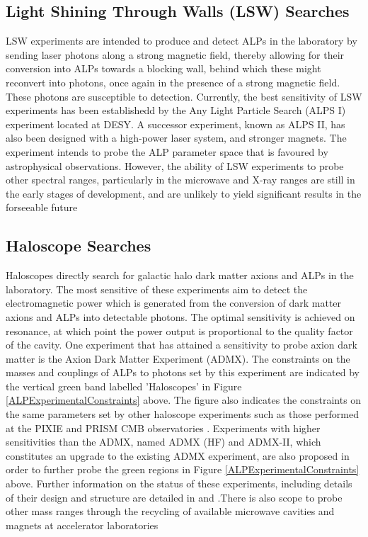 \subsection{Light Shining Through Walls (LSW) Searches}
LSW experiments are intended to produce and detect ALPs in the laboratory by sending laser photons along a strong magnetic field,
thereby allowing for their conversion into ALPs towards a blocking wall, behind which these might reconvert into photons, once again in the presence of 
a strong magnetic field. These photons are susceptible to detection. Currently, the best sensitivity of LSW experiments has been establishedd by the Any Light Particle Search
(ALPS I) experiment located at DESY. A successor experiment, known as ALPS II, has also been designed with a high-power laser system, and stronger magnets. The experiment intends to 
probe the ALP parameter space that is favoured by astrophysical observations. However, the ability of LSW experiments to probe other spectral ranges, particularly in the microwave and
X-ray ranges are still in the early stages of development, and are unlikely to yield significant results in the forseeable future
\subsection{Haloscope Searches}
Haloscopes directly search for galactic halo dark matter axions and ALPs in the laboratory. The most sensitive of these experiments aim to detect the electromagnetic power which is generated from the conversion of dark matter axions and ALPs into detectable photons.
The optimal sensitivity is achieved on resonance, at which point the power output is proportional to the quality factor of the cavity. One experiment that has attained a sensitivity to probe axion dark matter is the Axion Dark Matter Experiment (ADMX). The constraints on the masses
and couplings of ALPs to photons set by this
experiment are indicated by the vertical green band labelled 'Haloscopes' in Figure \ref{ALPExperimentalConstraints} above. The figure also indicates the constraints on the same parameters set by other haloscope experiments such as those performed at the PIXIE and PRISM CMB observatories \cite{https://doi.org/10.48550/arxiv.1407.0546}. Experiments with
higher sensitivities than the ADMX, named ADMX (HF) and ADMX-II, which constitutes an upgrade to the existing ADMX experiment, are also proposed in order to further probe the green regions in Figure \ref{ALPExperimentalConstraints} above. Further information on the status of these experiments, including details of their design and structure are detailed in \cite{ADMX:2020ote} and \cite{Nitta:2022jez}.There is also scope to probe other mass ranges through the recycling of available microwave cavities and magnets at accelerator laboratories \cite{https://doi.org/10.48550/arxiv.1407.0546}
